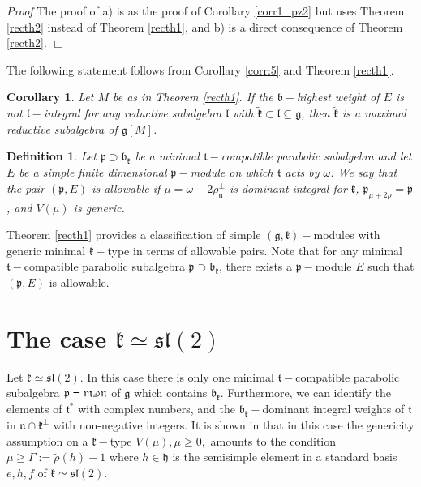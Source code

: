 \documentclass[10pt]{amsart}
\newtheorem{cor}[theo]{Corollary}
\renewenvironment{proof}{ \emph{Proof}}{$\Box$}
\newtheorem{defi}[theo]{Definition}
\newcommand{\bb}{\mathfrak{b}}
\renewcommand{\gg}{\mathfrak{g}}
\newcommand{\hh}{\mathfrak{h}}
\newcommand{\kk}{\mathfrak{k}}
\renewcommand{\ll}{\mathfrak{l}}
\newcommand{\mm}{\mathfrak{m}}
\newcommand{\nn}{\mathfrak{n}}
\newcommand{\pp}{\mathfrak{p}}
\renewcommand{\tt}{\mathfrak{t}}
\renewcommand{\sl}{\mathfrak{sl}}
\def\crplus{\hbox{$\supset${\raise1.05pt\hbox{\kern -0.55em ${\scriptscriptstyle +}$}}\ }}
\begin{document}
\begin{proof}
 The proof of a) is as the proof of Corollary \ref{corr1_pz2} but uses Theorem \ref{recth2} instead of Theorem \ref{recth1}, and b) is a direct consequence of Theorem \ref{recth2}.
\end{proof}

\vspace{0.3cm}

The following statement follows from Corollary \ref{corr:5} and Theorem \ref{recth1}.

\begin{cor}\label{corr:6}
 Let $M$ be as in Theorem \ref{recth1}. If the $\bb-$highest weight of $E$ is not $\ll-$integral for any reductive subalgebra $\ll$ with $\tilde{\kk} \subset \ll \subseteq \gg$, then $\tilde{\kk}$ is a maximal reductive subalgebra of $\gg[M]$.
\end{cor}


\begin{defi}\label{def:1}
 Let $\pp \supset \bb_{\kk}$ be a minimal $\tt-$compatible parabolic subalgebra and let $E$ be a simple finite dimensional $\pp-$module on which $\tt$ acts by $\omega$. We say that the pair $(\pp,E)$ is \textit{allowable} if $\mu = \omega + 2\rho^{\perp}_{\nn}$ is dominant integral for $\kk$, $\pp_{\mu+2\rho} = \pp$, and $V(\mu)$ is generic.
\end{defi}

Theorem \ref{recth1} provides a classification of simple $(\gg,\kk)-$modules with generic minimal $\kk-$type in terms of allowable pairs. Note that for any minimal $\tt-$compatible parabolic subalgebra $\pp \supset \bb_{\kk}$, there exists a $\pp-$module $E$ such that $(\pp,E)$ is allowable.

\section{The case $\kk \simeq \sl(2)$}\label{sect:3}

Let $\kk \simeq \sl(2)$. In this case there is only one minimal $\tt-$compatible parabolic subalgebra $\pp = \mm \crplus \nn$ of $\gg$ which contains $\bb_{\kk}$. Furthermore, we can identify the elements of $\tt^*$ with complex numbers, and the $\bb_{\kk}-$dominant integral weights of $\tt$ in $\nn \cap \kk^{\perp}$ with non-negative integers. It is shown in \cite{PZ2} that in this case the genericity assumption on a $\kk-$type $V(\mu), \mu \geq 0,$ amounts to the condition $\mu \geq \Gamma:=\tilde{\rho}(h)-1$ where $h \in \hh$ is the semisimple element in a standard basis $e,h,f$ of $\kk \simeq \sl(2)$.
\end{document}

